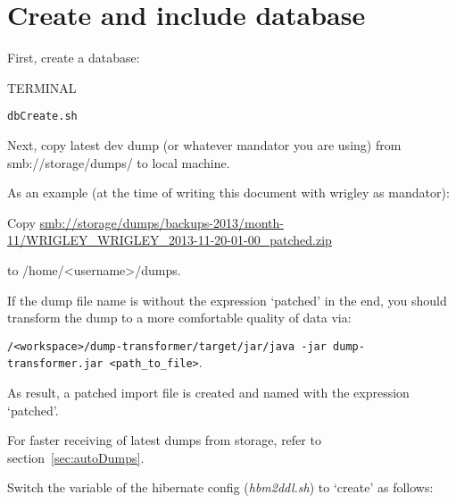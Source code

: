 \documentclass[10pt,a4paper]{article}
\begin{document}
\newpage
\section{Create and include database}
First, create a database:

\begin{command}{TERMINAL}
\begin{lstlisting}
dbCreate.sh
\end{lstlisting}
\end{command}

\noindent
Next, copy latest dev dump (or whatever mandator you are using) from smb://storage/dumps/ to local machine. 

\footnotesize
As an example (at the time of writing this document with wrigley as mandator):

Copy \href{smb://storage/dumps/backups-2013/month-11/WRIGLEY\_WRIGLEY\_2013-11-20-01-00\_patched.zip}{smb://storage/dumps/backups-2013/month-11/WRIGLEY\_WRIGLEY\_2013-11-20-01-00\_patched.zip} 

to /home/<username>/dumps.

\normalsize

\vspace{\baselineskip}

\tip{}If the dump file name is without the expression `patched' in the end, you should transform the dump to a more comfortable quality of data via: 

\footnotesize
\verb+/<workspace>/dump-transformer/target/jar/java -jar dump-transformer.jar <path_to_file>+. 
\normalsize

\noindent
As result, a patched import file is created and named with the expression `patched'.

\vspace{\baselineskip}

\tip{}For faster receiving of latest dumps from storage, refer to section~\ref{sec:autoDumps}.

\vspace{\baselineskip}

\noindent
Switch the variable of the hibernate config (\textit{hbm2ddl.sh}) to `create' as follows:
\end{document}
